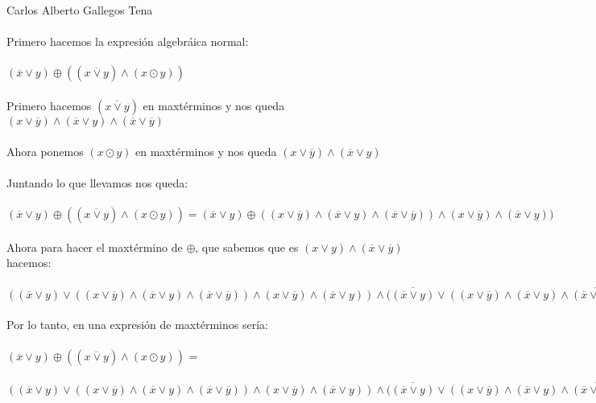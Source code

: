 \documentclass[a4paper,10pt]{article}
\title{}
\author{}
\date{}
\begin{document}
\maketitle
Carlos Alberto Gallegos Tena \\\\
Primero hacemos la expresión algebráica normal: \\\\
$(\overline{x} \vee y)   \oplus ((\overline{x \vee y})\wedge(x \odot y)) $\\\\
Primero hacemos $(\overline{x \vee y})$ en maxtérminos y nos queda  $(x \vee \overline{y})\wedge(\overline{x} \vee y)\wedge(\overline{x} \vee \overline{y})$\\\\
Ahora ponemos $(x \odot y)$ en maxtérminos y nos queda $(x \vee \overline{y})\wedge(\overline{x} \vee y)$\\\\
Juntando lo que llevamos nos queda:\\\\
$(\overline{x} \vee y)   \oplus ((\overline{x \vee y})\wedge(x \odot y))  = (\overline{x} \vee y)   \oplus ((x \vee \overline{y})\wedge(\overline{x} \vee y)\wedge(\overline{x} \vee \overline{y})) \wedge (x \vee \overline{y})\wedge(\overline{x} \vee y))$\\\\
Ahora para hacer el maxtérmino de $\oplus$, que sabemos que es $(x\vee y )\wedge (\overline{x} \vee \overline{y}) $ hacemos:\\\\
$((\overline{x} \vee y) \vee ((x \vee \overline{y})\wedge(\overline{x} \vee y)\wedge(\overline{x} \vee \overline{y})) \wedge (x \vee \overline{y})\wedge(\overline{x} \vee y))\wedge(\overline{(\overline{x} \vee y)} \vee \overline{((x \vee \overline{y})\wedge(\overline{x} \vee y)\wedge(\overline{x} \vee \overline{y})) \wedge (x \vee \overline{y})\wedge(\overline{x} \vee y))}$\\\\
Por lo tanto, en una expresión de maxtérminos sería:\\\\
$(\overline{x} \vee y)   \oplus ((\overline{x \vee y})\wedge(x \odot y)) $ = \\\\$((\overline{x} \vee y) \vee ((x \vee \overline{y})\wedge(\overline{x} \vee y)\wedge(\overline{x} \vee \overline{y})) \wedge (x \vee \overline{y})\wedge(\overline{x} \vee y))\wedge(\overline{(\overline{x} \vee y)} \vee \overline{((x \vee \overline{y})\wedge(\overline{x} \vee y)\wedge(\overline{x} \vee \overline{y})) \wedge (x \vee \overline{y})\wedge(\overline{x} \vee y))}$\\
\end{document}
